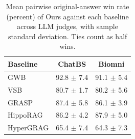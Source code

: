 \begin{table}
\caption{Mean pairwise original-answer win rate (percent) of Ours against each baseline across LLM judges, with sample standard deviation. Ties count as half wins.}
\label{tab:original-answer-ensemble-winrates}
\begin{tabular}{lcc}
\toprule
Baseline & ChatBS & Biomni \\
\midrule
GWB & 92.8 $\pm$ 7.4 & 91.1 $\pm$ 5.4 \\
VSB & 80.7 $\pm$ 1.7 & 80.2 $\pm$ 5.6 \\
GRASP & 87.4 $\pm$ 5.8 & 86.1 $\pm$ 3.9 \\
HippoRAG & 86.2 $\pm$ 4.2 & 87.9 $\pm$ 5.0 \\
HyperGRAG & 65.4 $\pm$ 7.4 & 64.3 $\pm$ 7.3 \\
\bottomrule
\end{tabular}
\end{table}
